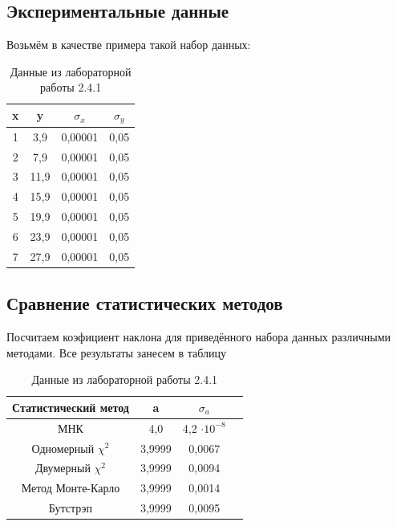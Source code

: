 \documentclass[a4paper,20pt]{article}
\theoremstyle{definition}
\begin{document}
\subsection{Экспериментальные данные}
Возьмём в качестве примера такой набор данных:

\begin{table}[H]
	\centering
	\begin{tabular}{|c|c|c|c|}
		\hline
		x& y & $\sigma_{x}$  & $\sigma_{y}$  \\ \hline
		1 & 3,9  & 0,00001  & 0,05           \\ \hline
		2 & 7,9  & 0,00001  & 0,05           \\ \hline
		3 & 11,9  & 0,00001  & 0,05           \\ \hline
		4 & 15,9  & 0,00001  & 0,05           \\ \hline
		5 & 19,9  & 0,00001  & 0,05           \\ \hline
		6 & 23,9  & 0,00001  & 0,05           \\ \hline
		7 & 27,9  & 0,00001  & 0,05           \\ \hline

	\end{tabular}
	\caption{Данные из лабораторной работы 2.4.1}
	\label{tab:izm}

\end{table}

\subsection{Сравнение статистических методов}
Посчитаем коэфициент наклона для приведённого набора данных различными методами. Все результаты занесем в таблицу

\begin{table}[H]
	\centering
	\begin{tabular}{|c|c|c|c|}
		\hline
		Статистический метод& a & $\sigma_{a}$ \\ \hline
		МНК & 4,0  & 4,2 $\cdot 10^{-8}$          \\ \hline
		Одномерный $\chi^2$ & 3,9999  & 0,0067           \\ \hline
		Двумерный $\chi^2$  & 3,9999  & 0,0094            \\ \hline
		Метод Монте-Карло & 3,9999  & 0,0014         \\ \hline
		Бутстрэп & 3,9999  &  0,0095           \\ \hline
		
	\end{tabular}
	\caption{Данные из лабораторной работы 2.4.1}
	\label{tab:izm}

\end{table}
\end{document}
